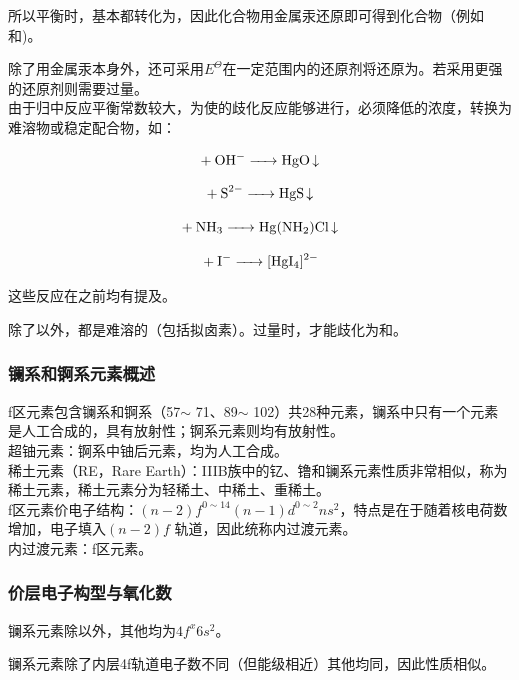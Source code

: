 \documentclass[a4paper,UTF8]{article}
\begin{document}
所以平衡时，基本都转化为，因此化合物用金属汞还原即可得到化合物（例如和)。

除了用金属汞本身外，还可采用$E^{\Theta}$在一定范围内的还原剂将还原为。若采用更强的还原剂则需要过量。\\

由于归中反应平衡常数较大，为使的歧化反应能够进行，必须降低的浓度，转换为难溶物或稳定配合物，如：

$$ \ce{+ OH- -> HgO\ce{v}} $$

$$ \ce{+ S^{2-} -> HgS\ce{v}} $$

$$ \ce{+ NH3 -> Hg(NH2)Cl\ce{v}} $$

$$ \ce{+ I- -> [HgI4]^{2-}} $$

这些反应在之前均有提及。

除了以外，都是难溶的（包括拟卤素）。过量时，才能歧化为和。

\subsubsection{镧系和锕系元素概述}

f区元素包含镧系和锕系（57$\sim$ 71、89$\sim$ 102）共28种元素，镧系中只有一个元素是人工合成的，具有放射性；锕系元素则均有放射性。\\

超铀元素：锕系中铀后元素，均为人工合成。\\

稀土元素（RE，Rare Earth）：IIIB族中的钇、镥和镧系元素性质非常相似，称为稀土元素，稀土元素分为轻稀土、中稀土、重稀土。\\

f区元素价电子结构：$ (n-2)f^{0\sim 14} (n-1)d^{0\sim 2} ns^2 $，特点是在于随着核电荷数增加，电子填入$ (n-2)f $ 轨道，因此统称内过渡元素。\\

内过渡元素：f区元素。\\

\subsubsection{价层电子构型与氧化数}

镧系元素除以外，其他均为$ 4f^x6s^2 $。

镧系元素除了内层4f轨道电子数不同（但能级相近）其他均同，因此性质相似。
\end{document}
